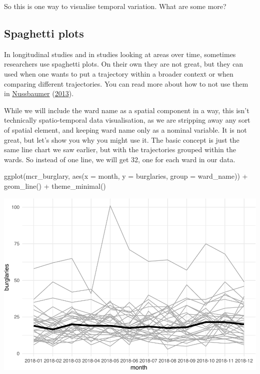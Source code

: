 \documentclass[
  krantz2]{krantz}
\makeatletter
\newenvironment{Shaded}{\begin{snugshade}}{\end{snugshade}}
\newcommand{\AttributeTok}[1]{\textcolor[rgb]{0.61,0.61,0.61}{#1}}
\newcommand{\FunctionTok}[1]{\textcolor[rgb]{0,0,0}{#1}}
\newcommand{\NormalTok}[1]{#1}
\newcommand{\SpecialCharTok}[1]{\textcolor[rgb]{0,0,0}{#1}}
\newenvironment{kframe}{%
\medskip{}
\setlength{\fboxsep}{.8em}
 \def\at@end@of@kframe{}%
 \ifinner\ifhmode%
  \def\at@end@of@kframe{\end{minipage}}%
  \begin{minipage}{\columnwidth}%
 \fi\fi%
 \def\FrameCommand##1{\hskip\@totalleftmargin \hskip-\fboxsep
 \colorbox{shadecolor}{##1}\hskip-\fboxsep
     \hskip-\linewidth \hskip-\@totalleftmargin \hskip\columnwidth}%
 \MakeFramed {\advance\hsize-\width
   \@totalleftmargin\z@ \linewidth\hsize
   \@setminipage}}%
 {\par\unskip\endMakeFramed%
 \at@end@of@kframe}
\renewenvironment{Shaded}{\begin{kframe}}{\end{kframe}}
\makeatother
\begin{document}
So this is one way to visualise temporal variation. What are some more?

\hypertarget{spaghetti-plots}{%
\subsection{Spaghetti plots}\label{spaghetti-plots}}

In longitudinal studies and in studies looking at areas over time, sometimes researchers use spaghetti plots. On their own they are not great, but they can used when one wants to put a trajectory within a broader context or when comparing different trajectories. You can read more about how to not use them in \protect\hyperlink{ref-Nussbaumer_2013}{Nussbaumer} (\protect\hyperlink{ref-Nussbaumer_2013}{2013}).

While we will include the ward name as a spatial component in a way, this isn't technically spatio-temporal data visualisation, as we are stripping away any sort of spatial element, and keeping ward name only as a nominal variable. It is not great, but let's show you why you might use it. The basic concept is just the same line chart we saw earlier, but with the trajectories grouped within the wards. So instead of one line, we will get 32, one for each ward in our data.

\begin{Shaded}
\begin{Highlighting}[]
\FunctionTok{ggplot}\NormalTok{(mcr\_burglary, }
       \FunctionTok{aes}\NormalTok{(}\AttributeTok{x =}\NormalTok{ month, }
           \AttributeTok{y =}\NormalTok{ burglaries, }
           \AttributeTok{group =}\NormalTok{ ward\_name)) }\SpecialCharTok{+} 
  \FunctionTok{geom\_line}\NormalTok{() }\SpecialCharTok{+} 
  \FunctionTok{theme\_minimal}\NormalTok{()}
\end{Highlighting}
\end{Shaded}

\includegraphics{crime_mapping_files/figure-latex/unnamed-chunk-182-1.pdf}
\end{document}
